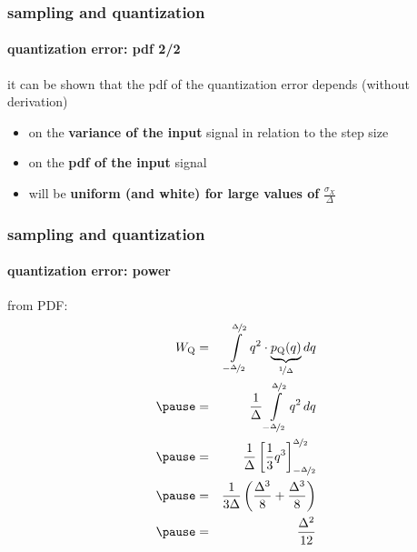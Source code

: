 	\begin{frame}\frametitle{sampling and quantization}\framesubtitle{quantization error: pdf 2/2}
        \vspace{-3mm}
        it can be shown that the pdf of the quantization error depends (without derivation)
        \begin{itemize}
            \item on the \textbf{variance of the input} signal in relation to the step size
            \item   on the \textbf{pdf of the input} signal
            \smallskip
            \item<2->[$\rightarrow$]   will be \textbf{uniform (and white) for large values of} $\frac{\sigma_X}{\Delta}$
        \end{itemize}
	\end{frame}
	\begin{frame}\frametitle{sampling and quantization}\framesubtitle{quantization error: power}
        \vspace{-2mm}
        \vspace{-2mm}
        \begin{footnotesize}
        from PDF:
        \begin{eqnarray*}
            W_\mathrm{Q} &=& \int\limits_{-\nicefrac{\Delta}{2}}^{\nicefrac{\Delta}{2}}{q^2\cdot \underbrace{p_\mathrm{Q}(q)}_{\nicefrac{1}{\Delta}}}\, dq\\
            \pause
            &=& \frac{1}{\Delta}\int\limits_{-\nicefrac{\Delta}{2}}^{\nicefrac{\Delta}{2}} q^2\, dq\\
            \pause
            &=& \frac{1}{\Delta} \left[\frac{1}{3}q^3\right]_{-\nicefrac{\Delta}{2}}^{\nicefrac{\Delta}{2}}\\
            \pause
            &=& \frac{1}{3\Delta}\left(\frac{\Delta^3}{8} + \frac{\Delta^3}{8}\right)\\
            \pause
            &=& \frac{\Delta^2}{12}
        \end{eqnarray*}
        \end{footnotesize}
        
	\end{frame}
